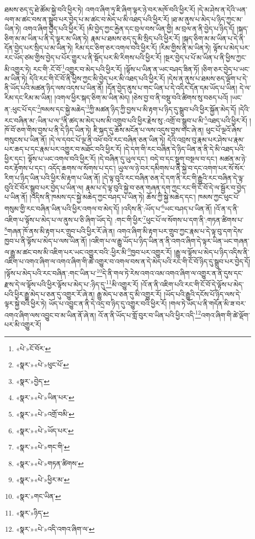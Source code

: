 ཐམས་ཅད་དུ་ཐེ་ཚོམ་སྐྱེ་བའི་ཕྱིར་ཏེ། འགའ་ཞིག་ཏུ་ཇི་ཞིག་ལྟར་ཉེ་བར་མཁོ་བའི་ཕྱིར་རོ། །དེ་མ་ཤེས་ན་དེའི་ཡན་ལག་མ་ཚང་བས་ན་སྒྲུབ་པར་བྱེད་པ་མ་ཚང་བ་མེད་པ་མི་འཐད་པའི་ཕྱིར་རོ། །ཐ་མ་ནུས་པ་མེད་པ་ཉིད་ཀྱང་མ་ཡིན་ཏེ། འགའ་ཞིག་བྱེད་པའི་ཕྱིར་རོ། །མི་བྱེད་ཀྱང་རྐྱེན་དང་བྲལ་བས་ཡིན་གྱི། མ་བྲལ་ན་ནི་བྱེད་པ་ཉིད་དོ། །སྐད་ཅིག་མ་མ་ཡིན་པ་ནི་དེ་ལྟར་མ་ཡིན་ཏེ། རྣམ་པ་ཐམས་ཅད་དུ་མི་སྲིད་པའི་ཕྱིར་རོ། །སྐད་ཅིག་མ་མ་ཡིན་པ་དེ་ནི་དོན་བྱེད་པར་སྲིད་པ་མ་ཡིན་ཏེ། རིམ་དང་ཅིག་ཅར་འགལ་བའི་ཕྱིར་རོ། །རིམ་གྱིས་ནི་མ་ཡིན་ཏེ། ལྟོས་པ་མེད་པར་རང་ཡོད་ཙམ་གྱིས་བྱེད་པ་པོར་གྱུར་པ་ནི་སྡོད་པར་མི་རིགས་པའི་ཕྱིར་རོ། །སྔར་བྱེད་པ་པོ་མ་ཡིན་པ་ནི་ཕྱིས་ཀྱང་མི་འགྱུར་ཏེ། རང་གི་:ངོ་བོ་\footnote{«པེ་»ངོ་བོར་}འགྱུར་བ་མེད་པའི་ཕྱིར་རོ། །ལྟོས་པ་ཡིན་ན་ཡང་བཤད་ཟིན་ཏོ། །ཅིག་ཅར་བྱེད་པ་ཡང་མ་ཡིན་ཏེ། དེའི་རང་གི་ངོ་བོ་ནི་ཕྱིས་ཀྱང་མི་བྱེད་པར་མི་འཐད་པའི་ཕྱིར་རོ། །དེས་ན་ནུས་པ་ཐམས་ཅད་ལྡོག་པ་དེ་ནི་ཡོད་པའི་མཚན་ཉིད་ལས་འདས་པ་ཡིན་ནོ། །དོན་བྱེད་ནུས་པ་གང་ཡིན་པ་དེ་འདིར་དོན་དམ་ཡོད་པ་ཡིན། དེ་ལ་རིམ་དང་རིམ་མ་ཡིན། །འགལ་ཕྱིར་སྐད་ཅིག་མ་ཡིན་མེད། །ཅེས་བྱ་བ་ནི་བསྡུ་བའི་ཚིགས་སུ་བཅད་པའོ། །ཡང་ན་:ཕུང་པོ་དང་\footnote{«སྣར་»«པེ་»ཕུང་པོ་}ཁམས་དང་སྐྱེ་མཆེད་\footnote{«སྣར་»བྱེད་}ཀྱི་མཚན་ཉིད་ཀྱི་བྱས་པ་མི་རྟག་པ་ཉིད་དུ་སྒྲུབ་པའི་ཕྱིར་སྐྱོན་མེད་དོ། །དེའི་རང་བཞིན་མ་:ཡིན་པ་ལ་\footnote{«སྣར་»«པེ་»ཡིན་པར་}ནི་ཚད་མ་མེད་པས་མི་འགྲུབ་པའི་ཕྱིར་རྗེས་སུ་:འགྲོ་བ་སྒྲུབ་པ་མི་\footnote{«སྣར་»«པེ་»འགྲོ་བམི་}འཐད་པའི་ཕྱིར་རོ། །ཁོ་བོ་ཅག་གིས་བྱས་པ་ནི་དེ་ཉིད་ཡིན་ཏེ། ཇི་སྐད་དུ་ཆོས་མངོན་པ་ལས་འདུས་བྱས་གང་ཞེ་ན། ཕུང་པོ་ལྔའོ་ཞེས་གསུངས་པ་ཡིན་ནོ། །དེ་ལ་དབང་པོ་ལྔ་ནི་འཕོ་བའི་རང་བཞིན་ཅན་ཡིན་ཏེ། དེའི་འབྲས་བུ་རྣམ་པར་ཤེས་པ་རྣམ་པར་ཆད་པ་དང་རྣམ་པར་འགྱུར་བ་མཐོང་བའི་ཕྱིར་རོ། །དེ་དག་གི་རང་བཞིན་དེ་ཉིད་ཡིན་ན་ནི་དེ་མི་འཐད་པའི་ཕྱིར་དང་། ལྟོས་པ་ཡང་འགལ་བའི་ཕྱིར་རོ། །དེ་བཞིན་དུ་ཡུལ་དང་། བདེ་བ་དང་སྡུག་བསྔལ་བ་དང་། མཚན་མ་ཉེ་བར་རྟོགས་པ་དང་། འདོད་ཆགས་ལ་སོགས་པ་དང་། ཡུལ་ལ་ཉེ་བར་དམིགས་པ་ནི་སྐྱེ་བ་དང་འགག་པར་སོ་སོར་རིག་པ་ཉིད་ཡིན་པའི་ཕྱིར་མི་རྟག་པ་ཡིན་ནོ། །དེ་ལྟ་བུའི་རང་བཞིན་ཅན་དེ་དག་ནི་རང་གི་རྒྱུའི་རང་བཞིན་དེ་ལྟ་བུའི་ངོ་བོར་སྒྲུབ་པར་བྱེད་པ་ཡིན་ལ། རྣམ་པ་དེ་ལྟ་བུའི་སྐྱེ་བ་ཅན་གཞན་དག་ཀྱང་རང་གི་ངོ་བོ་དེ་ལ་སྦྱོར་བ་བྱེད་པ་ཡིན་ནོ། །འདིས་ནི་ཁམས་དང་སྐྱེ་མཆེད་ཀྱང་བཤད་པ་ཡིན་ཏེ། ཆོས་ཀྱི་སྐྱེ་མཆེད་དང་། ཁམས་ཀྱང་ཕུང་པོ་གསུམ་གྱི་རང་བཞིན་ཡིན་པའི་ཕྱིར་འགལ་བ་མེད་དོ། །འདིས་ནི་:ཡོད་པ་\footnote{«སྣར་»«པེ་»ཡོད་པར་}ཡང་བཤད་པ་ཡིན་ནོ། །འོ་ན་ད་ནི་འཇིག་པ་ལྟོས་པ་མེད་པ་ལ་ནུས་པ་ཅི་ཞིག་ཡོད་དེ། :གང་གི་ཕྱིར་\footnote{«སྣར་»«པེ་»གང་གི་}ཕུང་པོ་ལ་སོགས་པ་དག་ནི་:གཏན་ཚིགས་པ་\footnote{«སྣར་»«པེ་»གཏན་ཚིགས་}གཞན་ཁོ་ནས་མི་རྟག་པར་གྲུབ་པའི་ཕྱིར་རོ་ཞེ་ན། འགའ་ཞིག་མི་རྟག་པར་གྲུབ་ཀྱང་རྣམ་པ་དེ་ལྟ་བུ་དག་དེས་ཁྱབ་པ་ནི་ལྟོས་པ་མེད་པ་ལས་ཡིན་ནོ། །འཇིག་པ་ལ་རྒྱུ་ཡོད་པ་ཉིད་ཡིན་ན་ནི་འགའ་ཞིག་དེ་ལྟར་ཡིན་ཡང་གཞན་ལ་རྒྱུ་མ་ཚང་བས་མི་འཇིག་པར་ཡང་འགྱུར་བའི་:ཕྱིར་མི་\footnote{«སྣར་»«པེ་»ཕྱིར་མ་}ཁྱབ་པར་འགྱུར་རོ། །རྒྱུ་ལ་ལྟོས་པ་མེད་པ་ཉིད་འདིས་ནི་འཇིག་པ་འགའ་ཞིག་ལ་འགའ་ཞིག་གི་ཚེ་འགྱུར་བ་འགལ་བས་ན་དེ་མེད་པའི་རང་གི་ངོ་བོ་ཉིད་དུ་སྒྲུབ་པར་བྱེད་དོ། །ལྟོས་པ་མེད་པའི་རང་བཞིན་:གང་ཡིན་པ་\footnote{«སྣར་»གང་ཡིན་}དེ་ནི་གལ་ཏེ་རེས་འགའ་འམ་འགའ་ཞིག་ལ་འགྱུར་ན་ནི་དུས་དང་རྫས་དེ་ལ་ལྟོས་པའི་ཕྱིར་ལྟོས་པ་མེད་པ་:ཉིད་དུ་\footnote{«སྣར་»ཉིད་}མི་འགྱུར་རོ། །འོ་ན་ནི་འཇིག་པའི་རང་གི་ངོ་བོ་དེ་ལྟོས་པ་མེད་པའི་ཕྱིར་རྒྱུ་མེད་པ་ཅན་དུ་འགྱུར་རོ་ཞེ་ན། རྒྱུ་མེད་པ་ཅན་དུ་མི་འགྱུར་རོ། །ཡོད་པའི་རྒྱུའི་དངོས་པོ་ཉིད་ལས་དེ་ལྟར་སྐྱེ་བའི་ཕྱིར་ཏེ། ཡོད་པ་འབྱུང་ན་ནི་དེ་འདྲ་བ་ཉིད་དུ་འགྱུར་བའི་ཕྱིར་རོ། །གལ་ཏེ་ཡོད་པ་ནི་གདོན་མི་ཟ་བར་འགའ་ཞིག་ལས་འབྱུང་བ་མ་ཡིན་ནོ་ཞེ་ན། འོ་ན་ནི་ཡོད་པ་གློ་བུར་བ་ཡིན་པའི་ཕྱིར་འདི་\footnote{«སྣར་»«པེ་»འདི་འགའ་ཞིག་ལ་}འགའ་ཞིག་གི་ཚེ་ལྡོག་པར་མི་འགྱུར་རོ། 